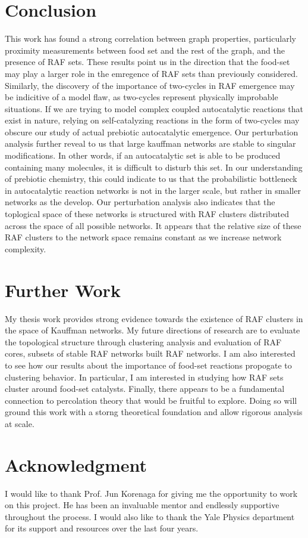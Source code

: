 \documentclass[11pt]{article}
\begin{document}
\section{Conclusion}

This work has found a strong correlation between graph properties, particularly proximity measurements between food set and the rest of the graph, and the presence of RAF sets. 
These results point us in the direction that the food-set may play a larger role in the emregence of RAF sets than previously considered. 
Similarly, the discovery of the importance of two-cycles in RAF emergence may be indicitive of a model flaw, as two-cycles represent physically improbable situations.
If we are trying to model complex coupled autocatalytic reactions that exist in nature, relying on self-catalyzing reactions in the form of two-cycles may obscure our study of actual prebiotic autocatalytic emergence. 
Our perturbation analysis further reveal to us that large kauffman networks are stable to singular modifications. 
In other words, if an autocatalytic set is able to be produced containing many molecules, it is difficult to disturb this set. 
In our understanding of prebiotic chemistry, this could indicate to us that the probabilistic bottleneck in autocatalytic reaction networks is not in the larger scale, but rather in smaller networks as the develop.
Our perturbation analysis also indicates that the toplogical space of these networks is structured with RAF clusters distributed across the space of all possible networks.
It appears that the relative size of these RAF clusters to the network space remains constant as we increase network complexity.



\section{Further Work}

My thesis work provides strong evidence towards the existence of RAF clusters in the space of Kauffman networks. 
My future directions of research are to evaluate the topological structure through clustering analysis and evaluation of RAF cores, subsets of stable RAF networks built RAF networks. 
I am also interested to see how our results about the importance of food-set reactions propogate to clustering behavior.
In particular, I am interested in studying how RAF sets cluster around food-set catalysts. 
Finally, there appears to be a fundamental connection to percolation theory that would be fruitful to explore.
Doing so will ground this work with a storng theoretical foundation and allow rigorous analysis at scale.



\section{Acknowledgment}

I would like to thank Prof. Jun Korenaga for giving me the opportunity to work on this project. He has been an invaluable mentor and endlessly supportive throughout the process. 
I would also like to thank the Yale Physics department for its support and resources over the last four years.
\end{document}
